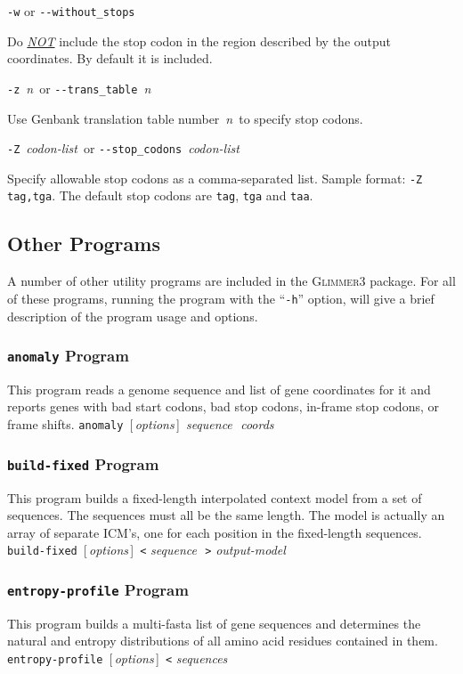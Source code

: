 \documentclass[fleqn,titlepage,11pt]{article}
\def\Desc#1{\,\mbox{\emph{#1}}\,}
\def\Gthree{\textsc{Glimmer3}}
\def\Pg#1{\texttt{#1}}
\begin{document}
\exdent
  \verb`-w` \enskip or \enskip \verb`--without_stops`

  Do \underline{\emph{NOT}} include the stop codon in the region
  described by the output coordinates.  By default it is included.

\exdent
  \verb`-z` \Desc{n} \enskip or \enskip \verb`--trans_table` \Desc{n}

  Use Genbank translation table number \Desc{n} to specify stop codons.

\exdent
  \verb`-Z` \Desc{codon-list} \enskip or \enskip \verb`--stop_codons` \Desc{codon-list}

  Specify allowable stop codons as a comma-separated list.
  Sample format:  \verb`-Z tag,tga`.
  The default stop codons are \Pg{tag}, \Pg{tga} and \Pg{taa}.
\el

\subsection{Other Programs}

A number of other utility programs are included in the \Gthree{}
package.  For all of these programs, running the program with
the ``\Pg{-h}'' option, will give a brief description of the
program usage and options.

\subsubsection{\Pg{anomaly} Program}
This program reads a genome sequence and list of gene coordinates
for it and reports genes with bad start codons, bad stop codons,
in-frame stop codons, or frame shifts.
\bq
  \Pg{anomaly}\, [\Desc{options}] \Desc{sequence} \Desc{coords}
\eq

\subsubsection{\Pg{build-fixed} Program}
This program builds a fixed-length interpolated context model
from a set of sequences.  The sequences must all be the same
length.  The model is actually an array of separate ICM's, one
for each position in the fixed-length sequences.
\bq
  \Pg{build-fixed}\, [\Desc{options}] \,\Pg{<}\,\Desc{sequence} \,\Pg{>}\,\Desc{output-model}
\eq

\subsubsection{\Pg{entropy-profile} Program}
This program builds a multi-fasta list of gene sequences and
determines the natural and entropy distributions of all
amino acid residues contained in them.
\bq
  \Pg{entropy-profile}\, [\Desc{options}] \,\Pg{<}\,\Desc{sequences}
\eq
\end{document}
